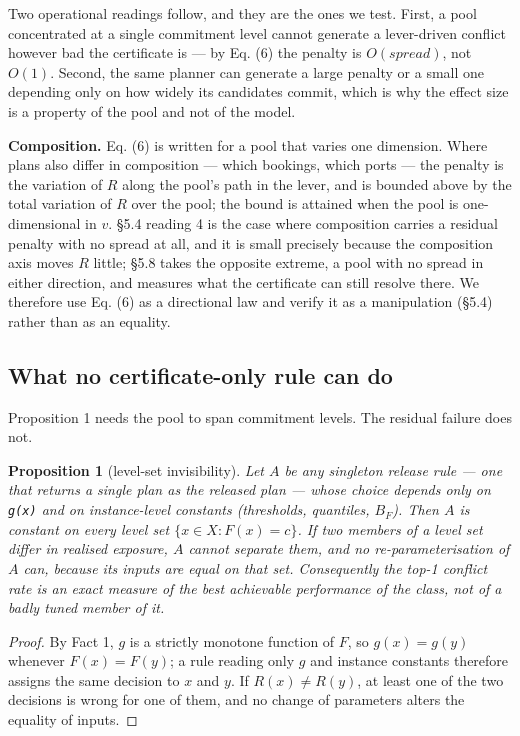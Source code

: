 \documentclass[preprint,12pt,letterpaper]{elsarticle}
\theoremstyle{definition}
\theoremstyle{plain}
\newtheorem{proposition}{Proposition}
\begin{document}
Two operational readings follow, and they are the ones we test. First, a pool concentrated at a single commitment level cannot generate a lever-driven conflict however bad the certificate is --- by Eq. (6) the penalty is $O(spread)$, not $O(1)$. Second, the same planner can generate a large penalty or a small one depending only on how widely its candidates commit, which is why the effect size is a property of the pool and not of the model.

\textbf{Composition.} Eq. (6) is written for a pool that varies one dimension. Where plans also differ in composition --- which bookings, which ports --- the penalty is the variation of $R$ along the pool's path in the lever, and is bounded above by the total variation of $R$ over the pool; the bound is attained when the pool is one-dimensional in $v$. \S 5.4 reading 4 is the case where composition carries a residual penalty with no spread at all, and it is small precisely because the composition axis moves $R$ little; \S 5.8 takes the opposite extreme, a pool with no spread in either direction, and measures what the certificate can still resolve there. We therefore use Eq. (6) as a directional law and verify it as a manipulation (\S 5.4) rather than as an equality.

\subsection{What no certificate-only rule can do}

Proposition 1 needs the pool to span commitment levels. The residual failure does not.

\begin{proposition}[level-set invisibility]
Let $A$ be any \textit{singleton} release rule --- one that returns a single plan as the released plan --- whose choice depends only on \texttt{g(x)} and on instance-level constants (thresholds, quantiles, $B_{F}$). Then $A$ is constant on every level set $\{x \in X : F(x) = c\}$. If two members of a level set differ in realised exposure, $A$ cannot separate them, and no re-parameterisation of $A$ can, because its inputs are equal on that set. Consequently the top-1 conflict rate is an exact measure of the best achievable performance of the class, not of a badly tuned member of it.
\end{proposition}

\begin{proof}
By Fact 1, $g$ is a strictly monotone function of $F$, so $g(x) = g(y)$ whenever $F(x) = F(y)$; a rule reading only $g$ and instance constants therefore assigns the same decision to $x$ and $y$. If $R(x) \neq R(y)$, at least one of the two decisions is wrong for one of them, and no change of parameters alters the equality of inputs.
\end{proof}
\end{document}
